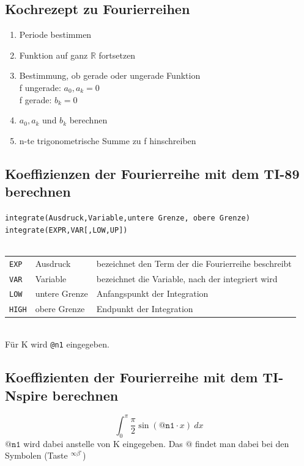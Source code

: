 \subsection{Kochrezept zu Fourierreihen}
\begin{enumerate}
  \item Periode bestimmen
  \item Funktion auf ganz $\mathbb{R}$ fortsetzen
  \item Bestimmung, ob gerade oder ungerade Funktion\\
  f ungerade: $a_0, a_k = 0$\\
  f gerade: $b_k = 0$
  \item $a_0, a_k$ und $b_k$ berechnen
  \item n-te trigonometrische Summe zu f hinschreiben
\end{enumerate}

\ifti
\subsection{Koeffizienzen der Fourierreihe mit dem TI-89 berechnen}
\verb?integrate(Ausdruck,Variable,untere Grenze, obere Grenze)? \\
\verb?integrate(EXPR,VAR[,LOW,UP])? \\\\
\begin{tabular}{@{}lll}
\verb?EXP?  & Ausdruck      & bezeichnet den Term der die Fourierreihe beschreibt \\
\verb?VAR?  & Variable      & bezeichnet die Variable, nach der integriert wird \\
\verb?LOW?  & untere Grenze & Anfangspunkt der Integration \\
\verb?HIGH? & obere Grenze  & Endpunkt der Integration \\
\end{tabular}\\
Für K wird \verb?@n1? eingegeben. 
\fi
\ifnspire
\subsection{Koeffizienten der Fourierreihe mit dem TI-Nspire berechnen}
\[ \int_{\boxed{0}}^{\boxed{\pi}}\boxed{\frac{\pi}{2}\sin(\mathtt{@n1} \cdot x)}~d\boxed{x} \]
$\mathtt{@n1}$ wird dabei anstelle von K eingegeben. Das $\mathtt{@}$ findet man dabei bei den Symbolen (Taste $\boxed{\boxed{^{\infty \beta ^\circ}}}$)
\fi

